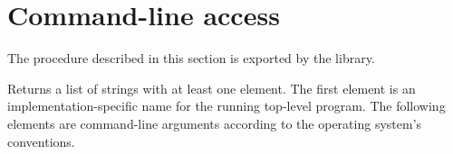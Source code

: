 \section{Command-line access}
\label{programlibsection}

The procedure described in this section is exported by the
 library.

\begin{entry}{%
}

Returns a list of strings with
at least one element.  The first element is an implementation-specific
name for the running top-level program.  The following elements are command-line
arguments according to the operating system's conventions.
\end{entry}

